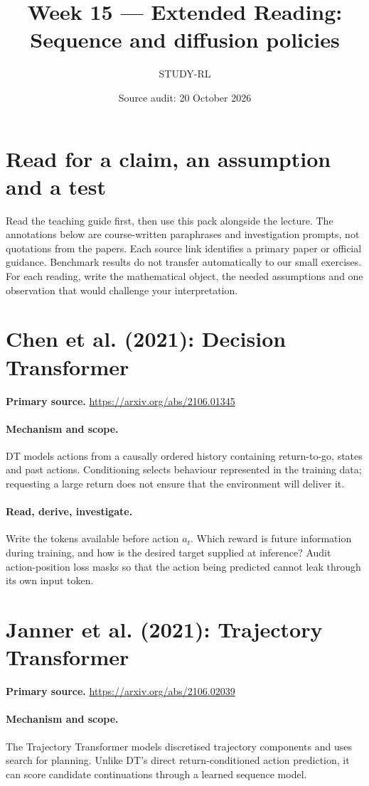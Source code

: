 \documentclass[11pt]{scrartcl}
\title{Week 15 --- Extended Reading: Sequence and diffusion policies}
\author{STUDY-RL}
\date{Source audit: 20 October 2026}
\begin{document}
\maketitle
\section*{Read for a claim, an assumption and a test}
Read the teaching guide first, then use this pack alongside the lecture.
The annotations below are course-written paraphrases and investigation prompts,
not quotations from the papers. Each source link identifies a primary paper
or official guidance. Benchmark results do not transfer automatically to our
small exercises. For each reading, write the mathematical object, the needed
assumptions and one observation that would challenge your interpretation.

\section{Chen et al. (2021): Decision Transformer}
\noindent\textbf{Primary source.} \url{https://arxiv.org/abs/2106.01345}

\paragraph{Mechanism and scope.} DT models actions from a causally ordered history containing return-to-go, states and past actions. Conditioning selects behaviour represented in the training data; requesting a large return does not ensure that the environment will deliver it.

\paragraph{Read, derive, investigate.} Write the tokens available before action $a_t$. Which reward is future information during training, and how is the desired target supplied at inference? Audit action-position loss masks so that the action being predicted cannot leak through its own input token.

\section{Janner et al. (2021): Trajectory Transformer}
\noindent\textbf{Primary source.} \url{https://arxiv.org/abs/2106.02039}

\paragraph{Mechanism and scope.} The Trajectory Transformer models discretised trajectory components and uses search for planning. Unlike DT's direct return-conditioned action prediction, it can score candidate continuations through a learned sequence model.
\end{document}
